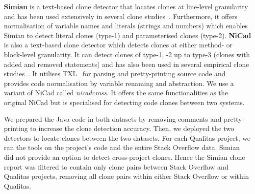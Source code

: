 \documentclass[sigconf,review, anonymous]{acmart}
\begin{document}
\textbf{Simian} is a text-based clone detector that locates clones at
line-level granularity and has been used extensively in several clone
studies~\cite{Ragkhitwetsagul2016, Wang2013, Mondal2011, Cheung2015,
  Krinke2010}.
Furthermore, it offers normalisation of variable names and literals
(strings and numbers) which enables Simian to detect literal clones
(type-1) and parameterised clones (type-2). \textbf{NiCad} is also a
text-based clone detector which detects clones at either method- or
block-level granularity. It can detect clones of type-1, -2 up to
type-3 (clones with added and removed statements) and has
also been used in several empirical clone studies~\cite{Roy2008,
  Ragkhitwetsagul2016, Svajlenko2014, Wang2013, Mondal2011,
  Sajnani2016}. It utilises TXL~\cite{Cordy2006} for parsing and
pretty-printing source code and provides code normalisation by
variable renaming and abstraction. We use a variant of NiCad called
\textit{nicadcross}. It offers the same functionalities as the
original NiCad but is specialised for detecting code clones between
two systems. 

We prepared the Java code in both datasets by removing comments and
pretty-printing to increase the clone detection accuracy. Then, we
deployed the two detectors to locate clones between the two
datasets.  For each Qualitas project, we ran the tools on the
project's code and the entire Stack Overflow data.
Simian did not provide an option to detect cross-project
clones. %
Hence the Simian clone report was filtered to contain only clone pairs
between Stack Overflow and Qualitas projects, removing all clone pairs
within either Stack Overflow or within Qualitas.
\end{document}
